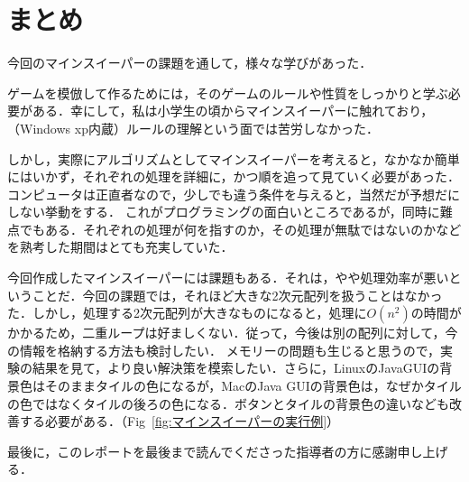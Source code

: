 \documentclass[a4j,11pt]{jsarticle}
\newcommand{\figref}[1]{Fig\ \ref{#1}}
\begin{document}
\part{まとめ}
今回のマインスイーパーの課題を通して，様々な学びがあった．\par
ゲームを模倣して作るためには，そのゲームのルールや性質をしっかりと学ぶ必要がある．幸にして，私は小学生の頃からマインスイーパーに触れており，（Windows xp内蔵）ルールの理解という面では苦労しなかった．\par
しかし，実際にアルゴリズムとしてマインスイーパーを考えると，なかなか簡単にはいかず，それぞれの処理を詳細に，かつ順を追って見ていく必要があった．コンピュータは正直者なので，少しでも違う条件を与えると，当然だが予想だにしない挙動をする．
これがプログラミングの面白いところであるが，同時に難点でもある．それぞれの処理が何を指すのか，その処理が無駄ではないのかなどを熟考した期間はとても充実していた．\par
今回作成したマインスイーパーには課題もある．それは，やや処理効率が悪いということだ．今回の課題では，それほど大きな2次元配列を扱うことはなかった．しかし，処理する2次元配列が大きなものになると，処理に\(O(n^2)\)の時間がかかるため，二重ループは好ましくない．従って，今後は別の配列に対して，今の情報を格納する方法も検討したい．
メモリーの問題も生じると思うので，実験の結果を見て，より良い解決策を模索したい．さらに，LinuxのJavaGUIの背景色はそのままタイルの色になるが，MacのJava GUIの背景色は，なぜかタイルの色ではなくタイルの後ろの色になる．ボタンとタイルの背景色の違いなども改善する必要がある．（\figref{fig:マインスイーパーの実行例}）\par
最後に，このレポートを最後まで読んでくださった指導者の方に感謝申し上げる．
\end{document}
